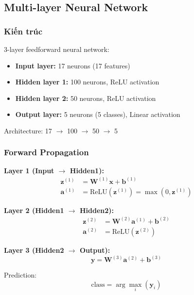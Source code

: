 \subsection{Multi-layer Neural Network}
\subsubsection{Kiến trúc}
3-layer feedforward neural network:

\begin{itemize}
    \item \textbf{Input layer:} 17 neurons (17 features)
    \item \textbf{Hidden layer 1:} 100 neurons, ReLU activation
    \item \textbf{Hidden layer 2:} 50 neurons, ReLU activation
    \item \textbf{Output layer:} 5 neurons (5 classes), Linear activation
\end{itemize}

Architecture: 17 $\rightarrow$ 100 $\rightarrow$ 50 $\rightarrow$ 5

\subsubsection{Forward Propagation}

\textbf{Layer 1 (Input $\rightarrow$ Hidden1):}
\begin{align}
\mathbf{z}^{(1)} &= \mathbf{W}^{(1)}\mathbf{x} + \mathbf{b}^{(1)} \\
\mathbf{a}^{(1)} &= \text{ReLU}(\mathbf{z}^{(1)}) = \max(0, \mathbf{z}^{(1)})
\end{align}

\textbf{Layer 2 (Hidden1 $\rightarrow$ Hidden2):}
\begin{align}
\mathbf{z}^{(2)} &= \mathbf{W}^{(2)}\mathbf{a}^{(1)} + \mathbf{b}^{(2)} \\
\mathbf{a}^{(2)} &= \text{ReLU}(\mathbf{z}^{(2)})
\end{align}

\textbf{Layer 3 (Hidden2 $\rightarrow$ Output):}
\begin{equation}
\mathbf{y} = \mathbf{W}^{(3)}\mathbf{a}^{(2)} + \mathbf{b}^{(3)}
\end{equation}

Prediction:
\begin{equation}
\text{class} = \arg\max_i(\mathbf{y}_i)
\end{equation}

